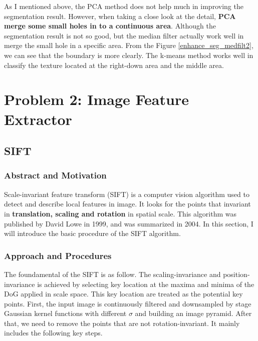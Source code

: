 \documentclass[11pt]{article}
\begin{document}
As I mentioned above, the PCA method does not help much in improving the segmentation result. However, when taking a close look at the detail, {\bf PCA merge some small holes in to a continuous area}.
Although the segmentation result is not so good, but the median filter actually work well in merge the small hole in a specific area. From the Figure \ref{enhance_seg_medfilt2}, we can see that the boundary is more clearly. The k-means method works well in classify the texture located at the right-down area and the middle area.
	


\section{Problem 2: Image Feature Extractor}
\subsection{SIFT}
\subsubsection{Abstract and Motivation}
Scale-invariant feature transform (SIFT) is a computer vision algorithm used to detect and describe local features in image. It looks for the points that invariant in {\bf translation, scaling and rotation} in spatial scale. This algorithm was published by David Lowe in 1999, and was summarized in 2004. In this section, I will introduce the basic procedure of the SIFT algorithm.
\subsubsection{Approach and Procedures}
The foundamental of the SIFT is as follow. The scaling-invariance and position-invariance is achieved by selecting key location at the maxima and minima of the DoG applied in scale space. This key location are treated as the potential key points. First, the input image is continuously filtered and downsampled by stage Gaussian kernel functions with different $\sigma$ and building an image pyramid. After that, we need to remove the points that are not rotation-invariant. It mainly includes the following key steps.
\end{document}
